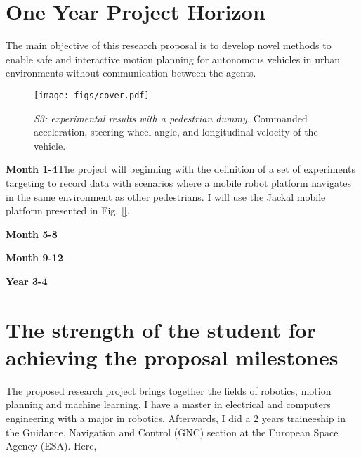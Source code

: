 \section{One Year Project Horizon}\label{research_plan}
The main objective of this research proposal is to develop novel methods to enable safe and interactive motion planning for autonomous vehicles in urban environments without communication between the agents.

\begin{figure*}[t]
\centering
\texttt{[image: figs/cover.pdf]} 
\caption{\emph{S3: experimental results with a pedestrian dummy.} Commanded acceleration, steering wheel angle, and longitudinal velocity of the vehicle.}
\label{fig:experiments}   
\end{figure*} 

\textbf{Month 1-4}The project will beginning with the definition of a set of experiments targeting to record data with scenarios where a mobile robot platform navigates in the same environment as other pedestrians. I will use the Jackal mobile platform presented in Fig. \ref{}.

\textbf{Month 5-8}

\textbf{Month 9-12}

\textbf{Year 3-4}

\section{The strength of the student for achieving the proposal milestones}\label{student}

The proposed research project brings together the fields of robotics, motion planning and machine learning. I have a master in electrical and computers engineering with a major in robotics. Afterwards, I did a 2 years traineeship in the Guidance, Navigation and Control (GNC) section at the European Space Agency (ESA). Here,